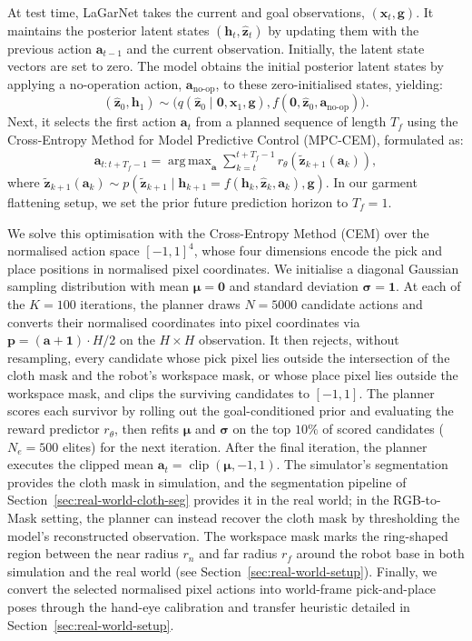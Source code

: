 \documentclass[journal]{IEEEtran}
\DeclareMathOperator*{\argmax}{arg\,max}
\begin{document}
At test time, LaGarNet takes the current and goal observations, $(\bm{x}_t, \bm{g})$. It maintains the posterior latent states $(\bm{h}_t, \hat{\bm{z}}_t)$ by updating them with the previous action $\bm{a}_{t-1}$ and the current observation. Initially, the latent state vectors are set to zero. The model obtains the initial posterior latent states by applying a no-operation action, $\bm{a}_{\text{no-op}}$, to these zero-initialised states, yielding:
\begin{equation}
    (\hat{\bm{z}}_0, \bm{h}_1) \sim \Big(q(\hat{\bm{z}}_0 \;|\; \bm{0}, \bm{x}_1, \bm{g}), f(\bm{0}, \hat{\bm{z}}_{0}, \bm{a}_{\text{no-op}})\Big).
\end{equation}
Next, it selects the first action $\bm{a}_t$ from a planned sequence of length $T_f$ using the Cross-Entropy Method for Model Predictive Control (MPC-CEM), formulated as:
\begin{align}
   \bm{a}_{t:t+T_f-1} = \argmax_{\bm{a}} \sum_{k=t}^{t+T_f-1} r_\theta(\tilde{\bm{z}}_{k+1}(\bm{a}_k)),
\end{align}
where $\tilde{\bm{z}}_{k+1}(\bm{a}_k) \sim p(\tilde{\bm{z}}_{k+1} \;|\; \bm{h}_{k+1}=f(\bm{h}_k, \hat{\bm{z}}_k, \bm{a}_k), \bm{g})$. In our garment flattening setup, we set the prior future prediction horizon to $T_f=1$.

We solve this optimisation with the Cross-Entropy Method (CEM) over the normalised action space $[-1,1]^4$, whose four dimensions encode the pick and place positions in normalised pixel coordinates. We initialise a diagonal Gaussian sampling distribution with mean $\bm{\mu}=\bm{0}$ and standard deviation $\bm{\sigma}=\bm{1}$. At each of the $K=100$ iterations, the planner draws $N=5000$ candidate actions and converts their normalised coordinates into pixel coordinates via $\bm{p} = (\bm{a}+\bm{1})\cdot H/2$ on the $H\times H$ observation. It then rejects, without resampling, every candidate whose pick pixel lies outside the intersection of the cloth mask and the robot's workspace mask, or whose place pixel lies outside the workspace mask, and clips the surviving candidates to $[-1,1]$. The planner scores each survivor by rolling out the goal-conditioned prior and evaluating the reward predictor $r_\theta$, then refits $\bm{\mu}$ and $\bm{\sigma}$ on the top $10\%$ of scored candidates ($N_e=500$ elites) for the next iteration. After the final iteration, the planner executes the clipped mean $\bm{a}_t = \operatorname{clip}(\bm{\mu}, -1, 1)$. The simulator's segmentation provides the cloth mask in simulation, and the segmentation pipeline of Section~\ref{sec:real-world-cloth-seg} provides it in the real world; in the RGB-to-Mask setting, the planner can instead recover the cloth mask by thresholding the model's reconstructed observation. The workspace mask marks the ring-shaped region between the near radius $r_n$ and far radius $r_f$ around the robot base in both simulation and the real world (see Section~\ref{sec:real-world-setup}). Finally, we convert the selected normalised pixel actions into world-frame pick-and-place poses through the hand-eye calibration and transfer heuristic detailed in Section~\ref{sec:real-world-setup}.
\end{document}
